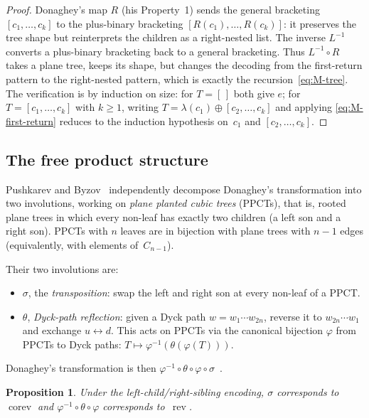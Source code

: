 \documentclass[a4paper,11pt]{article}
\newtheorem{proposition}[theorem]{Proposition}
\theoremstyle{definition}
\DeclareMathOperator{\rev}{rev}
\DeclareMathOperator{\corev}{corev}
\begin{document}
\begin{proof}
Donaghey's map $R$ (his Property~1) sends the general
bracketing $[c_1, \ldots, c_k]$ to the plus-binary
bracketing
$[R(c_1), \ldots, R(c_k)]$: it preserves the tree
shape but reinterprets the children as a right-nested
list. The inverse $L^{-1}$ converts a plus-binary
bracketing back to a general bracketing.
Thus $L^{-1} \circ R$ takes a plane tree, keeps its
shape, but changes the decoding from the first-return
pattern to the right-nested pattern, which is exactly
the recursion~\eqref{eq:M-tree}. The verification is
by induction on size: for $T = [\,]$ both give $e$;
for $T = [c_1, \ldots, c_k]$ with $k \geq 1$, writing
$T = \lambda(c_1) \oplus [c_2, \ldots, c_k]$ and
applying \eqref{eq:M-first-return} reduces to the
induction hypothesis on~$c_1$ and $[c_2, \ldots, c_k]$.
\end{proof}

\subsection{The free product structure}\label{sec:free-product}

Pushkarev and Byzov~\cite{PushkarevByzov14,PushkarevByzov19} independently
decompose Donaghey's transformation into two involutions, working on \emph{plane
  planted cubic trees} (PPCTs), that is, rooted plane trees in which every
non-leaf has exactly two children (a left son and a right son). PPCTs with $n$
leaves are in bijection with plane trees with $n - 1$ edges (equivalently, with
elements of~$C_{n-1}$).

Their two involutions are:
\begin{itemize}
\item $\sigma$, the \emph{transposition}: swap the left
  and right son at every non-leaf of a PPCT.
\item $\theta$, \emph{Dyck-path reflection}: given a
  Dyck path $w = w_1 \cdots w_{2n}$, reverse it to
  $w_{2n} \cdots w_1$ and exchange $u \leftrightarrow d$.
  This acts on PPCTs via the canonical bijection
  $\varphi$ from PPCTs to Dyck paths:
  $T \mapsto \varphi^{-1}(\theta(\varphi(T)))$.
\end{itemize}
Donaghey's transformation is then
$\varphi^{-1} \circ \theta \circ \varphi \circ
\sigma$~\cite[Definition~2.3]{PushkarevByzov14}.

\begin{proposition}\label{prop:pb-identification}
Under the left-child/right-sibling encoding,
$\sigma$ corresponds to~$\corev$ and
$\varphi^{-1} \circ \theta \circ \varphi$ corresponds
to~$\rev$.
\end{proposition}
\end{document}
